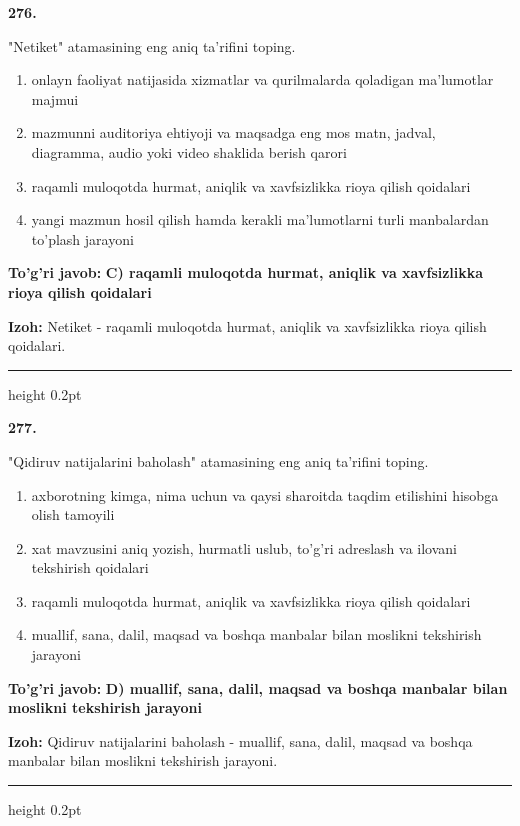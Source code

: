\documentclass[10pt,a4paper,oneside]{article}
\begin{document}
\noindent\textbf{\color{ink}276.}
\par
"Netiket" atamasining eng aniq ta'rifini toping.
\begin{enumerate}[label=\Alph*),leftmargin=9mm]
\item onlayn faoliyat natijasida xizmatlar va qurilmalarda qoladigan ma'lumotlar majmui
\item mazmunni auditoriya ehtiyoji va maqsadga eng mos matn, jadval, diagramma, audio yoki video shaklida berish qarori
\item raqamli muloqotda hurmat, aniqlik va xavfsizlikka rioya qilish qoidalari
\item yangi mazmun hosil qilish hamda kerakli ma'lumotlarni turli manbalardan to'plash jarayoni
\end{enumerate}
\begin{tcolorbox}[enhanced,breakable,colback=teal!4,colframe=teal!50!black,boxrule=0.5pt,arc=1.1mm,left=3mm,right=3mm,top=1.7mm,bottom=1.7mm,before skip=2mm,after skip=2mm]
\textbf{\color{teal}To'g'ri javob:} \textbf{C) raqamli muloqotda hurmat, aniqlik va xavfsizlikka rioya qilish qoidalari}
\par\smallskip
\textbf{Izoh:} Netiket - raqamli muloqotda hurmat, aniqlik va xavfsizlikka rioya qilish qoidalari.
\end{tcolorbox}
\vspace{2mm}\hrule height 0.2pt \vspace{3mm}

\noindent\textbf{\color{ink}277.}
\par
"Qidiruv natijalarini baholash" atamasining eng aniq ta'rifini toping.
\begin{enumerate}[label=\Alph*),leftmargin=9mm]
\item axborotning kimga, nima uchun va qaysi sharoitda taqdim etilishini hisobga olish tamoyili
\item xat mavzusini aniq yozish, hurmatli uslub, to'g'ri adreslash va ilovani tekshirish qoidalari
\item raqamli muloqotda hurmat, aniqlik va xavfsizlikka rioya qilish qoidalari
\item muallif, sana, dalil, maqsad va boshqa manbalar bilan moslikni tekshirish jarayoni
\end{enumerate}
\begin{tcolorbox}[enhanced,breakable,colback=teal!4,colframe=teal!50!black,boxrule=0.5pt,arc=1.1mm,left=3mm,right=3mm,top=1.7mm,bottom=1.7mm,before skip=2mm,after skip=2mm]
\textbf{\color{teal}To'g'ri javob:} \textbf{D) muallif, sana, dalil, maqsad va boshqa manbalar bilan moslikni tekshirish jarayoni}
\par\smallskip
\textbf{Izoh:} Qidiruv natijalarini baholash - muallif, sana, dalil, maqsad va boshqa manbalar bilan moslikni tekshirish jarayoni.
\end{tcolorbox}
\vspace{2mm}\hrule height 0.2pt \vspace{3mm}
\end{document}
